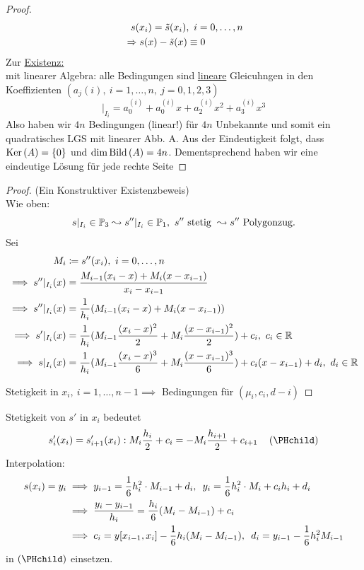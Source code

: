 \begin{proof}
\begin{align*}
        &\ \ s(x_i)=\Tilde{s}(x_i),\ i=0,\dots,n \\
        &\Rightarrow s(x)-\Tilde{s}(x)\equiv 0
    \end{align*} 
    Zur \underline{Existenz:}\\
    mit linearer Algebra: alle Bedingungen sind \underline{lineare} Gleicuhngen in den Koeffizienten $(a_j{(i)},
    \ i=1,\dots,n, \ j=0,1,2,3)$\[
        \vert_{I_i}= a_0^{(i)} + a_{0}^{(i)}x + a_{2}^{(i)}x^2 + a_3^{(i)}x^3
    \]
    Also haben wir $4n$ Bedingungen (linear!) für $4n$ Unbekannte und somit ein quadratisches LGS mit linearer Abb. A.
    Aus der Eindeutigkeit folgt, dass $\text{Ker}\left(A\right) = \left\{ 0 \right\}$ und $\dim\text{Bild}\left(A\right) = 4n$. Dementsprechend haben wir eine 
    eindeutige Lösung für jede rechte Seite 
\end{proof}

\begin{proof} (Ein Konstruktiver Existenzbeweis)\hfill\\
Wie oben: \[
s\vert_{I_i}\in\mathbb{P}_3 \leadsto s''\vert_{I_i}\in\mathbb{P}_1,\ s'' \text{ stetig }\leadsto s''\text{ Polygonzug}.
\]
Sei 
\begin{align*}
    M_i&\coloneqq s''(x_i),\ i=0,\dots, n \\
    \implies s''\vert_{I_i}(x)&=\frac{M_{i-1}(x_i-x)+M_{i}(x-x_{i-1})}{x_i-x_{i-1}}\\
    \implies s''\vert_{I_i}(x)&=\dfrac{1}{h_i}(M_{i-1}(x_i-x)+M_{i}(x-x_{i-1}))\\
    \implies s'\vert_{I_i}(x)&= \frac{1}{h_i}(M_{i-1}\frac{(x_i-x)^2}{2}+M_{i}\frac{(x-x_{i-1})^2}{2}) + c_i , \ c_i\in\R \\
    \implies s\vert_{I_i}(x) &= \frac{1}{h_i}(M_{i-1}\frac{(x_i-x)^3}{6}+M_{i}\frac{(x-x_{i-1})^3}{6}) +c_i(x-x_{i-1})+d_i, \ 
    d_i\in\R
\end{align*}

Stetigkeit in \(x_i,\ i=1,\dots,n-1 \implies \) Bedingungen für \((\mu_i, c_i, d-i)\) 

\end{proof}

Stetigkeit von $s'$ in $x_i$ bedeutet\[
    s_i'(x_i) = s_{i+1}'(x_i) : M_i \frac{h_i}{2} + c_i = -M_i\frac{h_{i+1}}{2} + c_{i+1}\largespace \left(\text{\PHchild}
    \right)\]
    Interpolation: \begin{align*}
        s(x_i) = y_i &\implies y_{i-1} = \frac{1}{6}h_i^2\cdot M_{i-1}+ d_i, 
        \hspace{.5em} y_i = \frac{1}{6}h_i^2\cdot M_i+c_ih_i+d_i\\
        &\implies \frac{y_i-y_{i-1}}{h_i} = \frac{h_i}{6}(M_i - M_{i-1}) + c_i\\
        &\implies c_i = y[x_{i-1}, x_i] - \frac{1}{6}h_i(M_i- M_{i-1}), \hspace{.5em} d_i = y_{i-1}-\frac{1}{6}h_i^2M_{i-1}
    \end{align*}
    in $\left(\text{\PHchild}\right)$ einsetzen.

